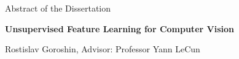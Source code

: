 \documentclass[12pt,letterpaper]{report}
\newcommand{\thesistitle}{Unsupervised Feature Learning for Computer Vision}
\newcommand{\thesisauthor}{Rostislav Goroshin}
\newcommand{\thesisadvisor}{Professor Yann LeCun}
\begin{document}
\thispagestyle{empty}
  \begin{center}
    Abstract of the Dissertation

    \textbf{\thesistitle}

    \thesisauthor,   Advisor: \thesisadvisor
  \end{center}
 \bigskip
\vspace{-0.6cm}


\end{document}
